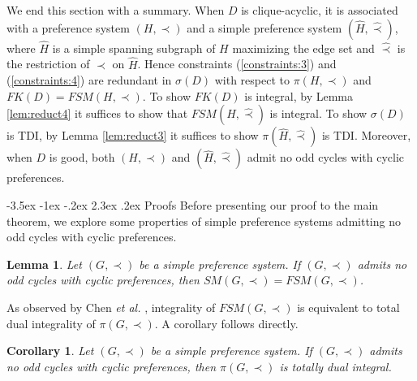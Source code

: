 \documentclass[11pt]{article}
\makeatletter
\newtheorem{lemma}[theorem]{Lemma}
\newtheorem{corollary}[theorem]{Corollary}
\numberwithin{theorem}{section}
\renewcommand\section{%
  \@startsection{section}{1}
                {\z@}%
                {-3.5ex \@plus -1ex \@minus -.2ex}%
                {2.3ex \@plus.2ex}%
                {\large\bfseries}%
}
\makeatother
\begin{document}
We end this section with a summary. When $D$ is clique-acyclic, it is associated with a preference system $(H,\prec)$ and a simple preference system $(\hat{H},\hat\prec)$, where $\hat{H}$ is a simple spanning subgraph of $H$ maximizing the edge set and $\hat\prec$ is the restriction of $\prec$ on $\hat{H}$.
Hence constraints (\ref{constraints:3}) and (\ref{constraints:4}) are redundant in $\sigma(D)$ with respect to $\pi(H,\prec)$ and $FK(D)=FSM(H,\prec)$. To show $FK(D)$ is integral, by Lemma \ref{lem:reduct4} it suffices to show that $FSM(\hat{H},\hat\prec)$ is integral. To show $\sigma(D)$ is TDI, by Lemma \ref{lem:reduct3} it suffices to show $\pi(\hat{H},\hat\prec)$ is TDI. Moreover, when $D$ is good, both $(H,\prec)$ and $(\hat{H},\hat\prec)$ admit no odd cycles with cyclic preferences.

\section{Proofs}
Before presenting our proof to the main theorem, we explore some properties of simple preference systems admitting no odd cycles with cyclic preferences.
\begin{lemma}
\label{lem:prf1}
Let $(G,\prec)$ be a simple preference system. If $(G,\prec)$ admits no odd cycles with cyclic preferences, then $SM(G,\prec)=FSM(G,\prec)$.
\end{lemma}

As observed by Chen \textit{et al.} \cite{ChenDing12}, integrality of $FSM(G,\prec)$ is equivalent to total dual integrality of $\pi(G,\prec)$. A corollary follows directly.

\begin{corollary}
\label{cor:prf2}
Let $(G,\prec)$ be a simple preference system. If $(G,\prec)$ admits no odd cycles with cyclic preferences, then $\pi(G,\prec)$ is totally dual integral.
\end{corollary}
\end{document}
